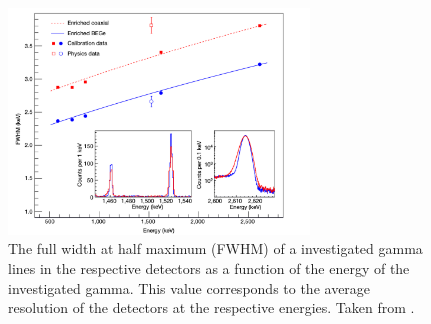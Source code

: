 \begin{figure}[t]
	\centering
	\ifmakefigures%
	\includegraphics[width=80mm]{./Bilder/Aufloesung.png}
	\fi%
	\caption{
		The full width at half maximum (FWHM) of a investigated gamma lines in the respective detectors as a function of the energy of the investigated gamma.
		This value corresponds to the average resolution of the detectors at the respective energies.
		Taken from \cite{agostini_background_2017}.
	}
	\label{fig:Aufloesung}
\end{figure}

